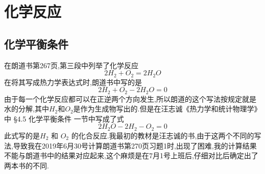 \chapter{化学反应}

\section{化学平衡条件}

在朗道书第267页,第三段中列举了化学反应
\begin{equation}
  2H_2+O_2=2H_2O
  \label{eq:HOfanying}
\end{equation}
在将其写成热力学表达式时,朗道书中写的是
\begin{equation}
  2H_2+O_2-2H_2O=0
\end{equation}
由于每一个化学反应都可以在正逆两个方向发生,所以朗道的这个写法按规定就是水的分解,其中$H_2$和$O_2$是作为生成物写出的.但是在汪志诚《热力学和统计物理学》中 \S 4.5 化学平衡条件 一节中写成了式
\begin{equation}
  2H_2O-2H_2-O_2=0
\end{equation}
此式写的是$H_2$ 和 $O_2$ 的化合反应.我最初的教材是汪志诚的书,由于这两个不同的写法,导致我在2019年6月30号计算朗道书第270页习题1时,出现了困难,我的计算结果不能与朗道书中的结果对应起来,这个麻烦是在7月1号上班后,仔细对比后确定出了两本书的不同.

